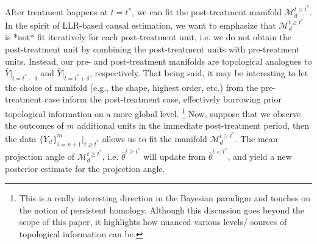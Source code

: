 \documentclass[twoside,11pt]{article}
\begin{document}
After treatment happens at $t=t^*$, we can fit the post-treatment manifold $\mathcal{M}_d^{t \geq t^*}$. In the spirit of LLR-based causal estimation, we want to emphasize that $\mathcal{M}_d^{t \geq t^*}$ is *not* fit iteratively for each post-treatment unit, i.e. we do not obtain the post-treatment unit by combining the post-treatment units with pre-treatment units. Instead, our pre- and post-treatment manifolds are topological analogues to $\bar{Y}|_{t = t^* - \delta}$ and $\bar{Y}|_{t = t^* + \delta}$, respectively. That being said, it may be interesting to let the choice of manifold (e.g., the shape, highest order, etc.) from the pre-treatment case inform the post-treatment case, effectively borrowing prior topological information on a more global level. \footnote{This is a really interesting direction in the Bayesian paradigm and touches on the notion of persistent homology. Although this discussion goes beyond the scope of this paper, it highlights how nuanced various levels/ sources of topological information can be.} Now, suppose that we observe the outcomes of $m$ additional units in the immediate post-treatment period, then the data $\{Y_{it}\}_{i=n+1}^{m}|_{t \geq t^*}$ allows us to fit the manifold $\mathcal{M}_d^{t \geq t^*}$. The mean projection angle of $\mathcal{M}_d^{t \geq t^*}$, i.e. $\bar{\theta}^{t \geq t^*}$ will update from $\bar{\theta}^{t < t^*}$, and yield a new posterior estimate for the projection angle.  
\end{document}
